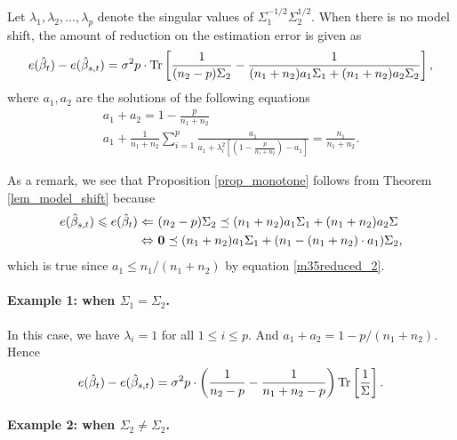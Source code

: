 \begin{theorem}\label{lem_model_shift}
	Let $\lambda_1, \lambda_2, \dots, \lambda_p$ denote the singular values of $\Sigma_1^{-1/2}\Sigma_2^{1/2}$.
	When there is no model shift, the amount of reduction on the estimation error is given as
	\begin{align*}
		e(\hat{\beta}_t) - e(\hat{\beta}_{s,t})
		= \sigma^2 p \cdot \operatorname{Tr}\left[\frac 1 {(n_2 - p) \Sigma_2} - \frac 1 {(n_1 + n_2)a_1 \Sigma_1 + (n_1 + n_2)a_2 \Sigma_2}\right],
	\end{align*}
	where $a_1, a_2$ are the solutions of the following equations
	\begin{gather}
		 a_1 + a_2 = 1- \frac{p}{n_1 + n_2} \label{m35reduced_1}\\
		 a_1 +\frac1{n_1 + n_2}\sum_{i=1}^p \frac{a_1}{a_1 + \lambda_i^2[(1-\frac{p}{n_1 + n_2})-a_1]} = \frac{n_1}{n_1 + n_2}. \label{m35reduced_2}
	\end{gather}
\end{theorem}

As a remark, we see that Proposition \ref{prop_monotone} follows from Theorem \ref{lem_model_shift} because
\begin{align*}
	e(\hat{\beta}_{s,t}) \leqslant e(\hat{\beta}_t)
	\Leftarrow~ & (n_2 - p)\Sigma_2 \preceq (n_1 + n_2) a_1 \Sigma_1 + (n_1 + n_2)a_2 \Sigma \\
	\Leftrightarrow~ & \mathbf{0} \preceq (n_1 + n_2) a_1 \Sigma_1 + (n_1 - (n_1 + n_2)\cdot a_1) \Sigma_2,
\end{align*}
which is true since $a_1 \le n_1 / (n_1 + n_2)$ by equation \eqref{m35reduced_2}.

\paragraph{Example 1: when $\Sigma_1 = \Sigma_2$.}
In this case, we have $\lambda_i = 1$ for all $1\le i\le p$.
And $a_1 + a_2 = 1 - p / (n_1 + n_2)$.
Hence
\[ e(\hat{\beta}_t) - e(\hat{\beta}_{s,t}) = \sigma^2 p \cdot \left({\frac{1}{n_2 - p} - \frac{1}{n_1 + n_2 - p}}\right) \operatorname{Tr}\left[\frac 1 {\Sigma}\right]. \]

\paragraph{Example 2: when $\Sigma_2 \neq \Sigma_2$.}

